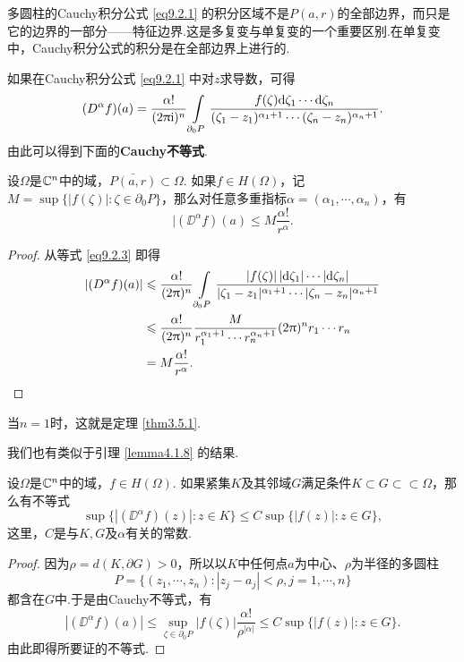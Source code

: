 多圆柱的Cauchy积分公式 \eqref{eq9.2.1} 的积分区域不是$P(a,r)$的全部边界，而只是它的边界的一部分——特征边界.这是多复变与单复变的一个重要区别.在单复变中，Cauchy积分公式的积分是在全部边界上进行的.

如果在Cauchy积分公式 \eqref{eq9.2.1} 中对$z$求导数，可得
\begin{equation}\label{eq9.2.3}
(D^\alpha f)(a)=\frac{\alpha!}{(2\uppi\textrm i)^n}
\int\limits_{\partial_0P}
\frac{f(\zeta)\textrm d\zeta_1\cdots\textrm d\zeta_n}{(\zeta_1-z_1)^{\alpha_1+1}\cdots(\zeta_n-z_n)^{\alpha_n+1}}.
\end{equation}
由此可以得到下面的\textbf{Cauchy不等式}.
\begin{theorem}\label{thm9.2.2}
设$\Omega$是$\mathbb C^n$中的域，$\bar{P(a,r)}\subset\Omega$. 如果$f\in H(\Omega)$，记$M=\sup\{|f(\zeta)|:\zeta\in\partial_0P\}$，那么对任意多重指标$\alpha=(\alpha_1,\cdots,\alpha_n)$，有
\[|(\DD^\alpha f)(a)\le M\frac{\alpha!}{r^\alpha}.\]
\end{theorem}
\begin{proof}
从等式 \eqref{eq9.2.3} 即得
\begin{align*}
|(D^\alpha f)(a)|&\leqslant\frac{\alpha!}{(2\uppi)^n}
\int\limits_{\partial_0P}
\frac{|f(\zeta)|\,|\textrm d\zeta_1|\cdots|\textrm d\zeta_n|}{|\zeta_1-z_1|^{\alpha_1+1}\cdots|\zeta_n-z_n|^{\alpha_n+1}}\\
&\leqslant\frac{\alpha!}{(2\uppi)^n}\frac M{r_1^{\alpha_1+1}\cdots r_n^{\alpha_n+1}}
(2\uppi)^nr_1\cdots r_n\\
&=M\frac{\alpha!}{r^\alpha}.
\end{align*}
\end{proof}

当$n=1$时，这就是定理 \ref{thm3.5.1}.

我们也有类似于引理 \ref{lemma4.1.8} 的结果.
\begin{theorem}\label{thm9.2.3}
设$\Omega$是$\mathbb C^n$中的域，$f\in H(\Omega)$. 如果紧集$K$及其邻域$G$满足条件$K\subset G\subset\subset \Omega$，那么有不等式
\[\sup\{|(\DD^\alpha f)(z)|:z\in K\}\le C\sup\{|f(z)|:z\in G\},\]
这里，$C$是与$K,G$及$\alpha$有关的常数.
\end{theorem}
\begin{proof}
因为$\rho=d(K,\partial G)>0$，所以以$K$中任何点$a$为中心、$\rho$为半径的多圆柱
\[P=\{(z_1,\cdots,z_n):|z_j-a_j|<\rho,j=1,\cdots,n\}\]
都含在$G$中.于是由Cauchy不等式，有
\[|(\DD^\alpha f)(a)|\le\sup_{\zeta\in\partial_0P}|f(\zeta)|\frac{\alpha!}{\rho^{|\alpha|}}
\le C\sup\{|f(z)|:z\in G\}.\]
由此即得所要证的不等式.
\end{proof}

